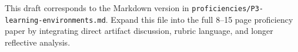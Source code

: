 \documentclass[12pt]{article}
\begin{document}
\begin{titlepage}\begin{center}\vspace*{0.2\textheight}{\Large\bfseries Proficiency 3: Learning Environments\par}\vspace{2em}{\PortfolioAuthor\par}{\PortfolioAffiliation\par}{\PortfolioProgram\par}\vspace{2em}{\PortfolioDate\par}\end{center}\end{titlepage}
This draft corresponds to the Markdown version in \texttt{proficiencies/P3-learning-environments.md}. Expand this file into the full 8--15 page proficiency paper by integrating direct artifact discussion, rubric language, and longer reflective analysis.
\end{document}
